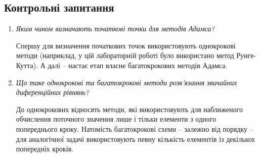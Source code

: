 \documentclass[a4paper,14pt]{extarticle} %
\begin{document}
\subsection*{Контрольні запитання}

\begin{enumerate}
    \item \textit{Яким чином визначають початкові точки для методів Адамса?}

    Спершу для визначення початкових точок використовують однокрокові методи (наприклад, у цій 
    лабораторній роботі було використано метод Рунге-Кутта). А далі -- настає етап власне 
    багатокрокових методів Адамса.
    
    \item \textit{Що таке однокрокові та багатокрокові методи розв’язання звичайних диференційних
    рівнянь?}
    
    До однокрокових відносять методи, які використовують для наближеного обчислення поточного значення лише 
    і тільки елементи з одного попереднього кроку. Натомість багатокрокові схеми -- залежно від порядку -- 
    для аналогічної задачі використовують певну кількість елементів із декількох попередніх кроків.  
    
\end{enumerate}
\end{document}
